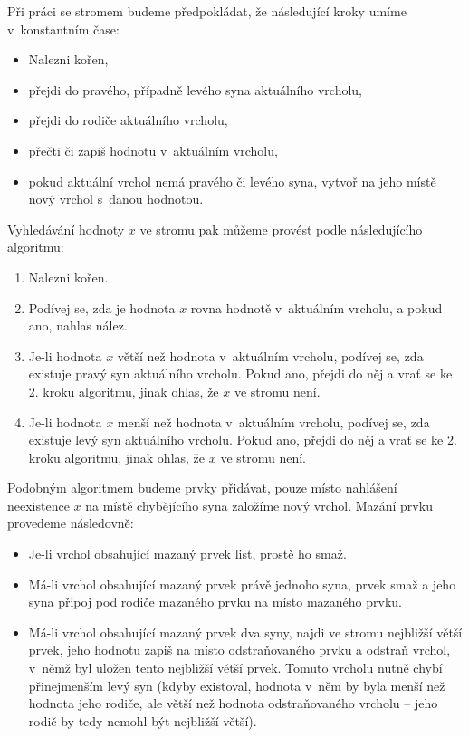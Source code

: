 Při práci se stromem budeme předpokládat, že následující kroky umíme v~konstantním čase:
\begin{itemize}
\item Nalezni kořen,
\item přejdi do pravého, případně levého syna aktuálního vrcholu,
\item přejdi do rodiče aktuálního vrcholu,
\item přečti či zapiš hodnotu v~aktuálním vrcholu,
\item pokud aktuální vrchol nemá pravého či levého syna, vytvoř na jeho místě nový vrchol s~danou hodnotou.
\end{itemize}
Vyhledávání hodnoty $x$ ve stromu pak můžeme provést podle následujícího algoritmu:
\begin{enumerate}
\item Nalezni kořen.
\item Podívej se, zda je hodnota $x$ rovna hodnotě v~aktuálním vrcholu, a pokud ano, nahlas nález.
\item Je-li hodnota $x$ větší než hodnota v~aktuálním vrcholu, podívej se, zda existuje pravý syn aktuálního vrcholu. Pokud ano, přejdi do něj a vrať se ke 2. kroku algoritmu, jinak ohlas, že  $x$ ve stromu není.
\item Je-li hodnota $x$ menší než hodnota v~aktuálním vrcholu, podívej se, zda existuje levý syn aktuálního vrcholu. Pokud ano, přejdi do něj a vrať se ke 2. kroku algoritmu, jinak ohlas, že  $x$ ve stromu není.
\end{enumerate}

Podobným algoritmem budeme prvky přidávat, pouze místo nahlášení neexistence $x$ na místě chybějícího syna založíme nový vrchol. Mazání prvku provedeme následovně:

\begin{itemize}
\item Je-li vrchol obsahující mazaný prvek list, prostě ho smaž.
\item Má-li vrchol obsahující mazaný prvek právě jednoho syna, prvek smaž a jeho syna připoj pod rodiče mazaného prvku na místo mazaného prvku.
\item Má-li vrchol obsahující mazaný prvek dva syny, najdi ve stromu nejbližší větší prvek, jeho
hodnotu zapiš na místo odstraňovaného prvku a odstraň vrchol, v~němž byl uložen tento nejbližší větší
prvek. Tomuto vrcholu nutně chybí přinejmenším levý syn (kdyby existoval, hodnota
v~něm by byla menší než hodnota jeho rodiče, ale větší než hodnota odstraňovaného
vrcholu -- jeho rodič by tedy nemohl být nejbližší větší).  
\end{itemize} 

